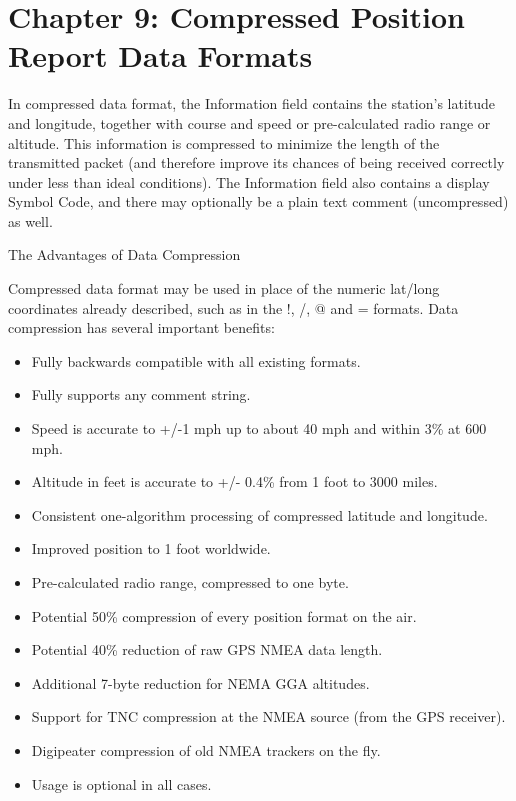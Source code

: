 
\chapter{Chapter 9: Compressed Position Report Data Formats}


In compressed data format, the Information field contains the station’s
latitude and longitude, together with course and speed or pre-calculated radio
range or altitude.
This information is compressed to minimize the length of the transmitted
packet (and therefore improve its chances of being received correctly under
less than ideal conditions).
The Information field also contains a display Symbol Code, and there may
optionally be a plain text comment (uncompressed) as well.

The Advantages of
Data Compression

Compressed data format may be used in place of the numeric lat/long
coordinates already described, such as in the !, /, @ and = formats.
Data compression has several important benefits:

\begin{itemize}
  
\item Fully backwards compatible with all existing formats.

\item Fully supports any comment string.

\item Speed is accurate to +/-1 mph up to about 40 mph and within 3\%
  at 600 mph.

\item Altitude in feet is accurate to +/- 0.4\% from 1 foot to 3000 miles.

\item Consistent one-algorithm processing of compressed latitude and
  longitude.

\item Improved position to 1 foot worldwide.

\item Pre-calculated radio range, compressed to one byte.

\item Potential 50\% compression of every position format on the air.

\item Potential 40\% reduction of raw GPS NMEA data length.

\item Additional 7-byte reduction for NEMA GGA altitudes.

\item Support for TNC compression at the NMEA source (from the GPS
  receiver).

\item Digipeater compression of old NMEA trackers on the fly.

\item Usage is optional in all cases.

\end{itemize}


